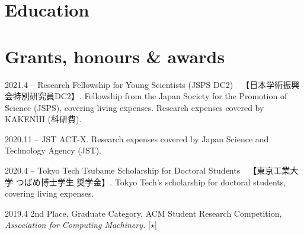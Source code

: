 \documentclass[11pt]{article} %
\newcommand{\伊澤侑祐}{\underline{伊澤侑祐}}
\begin{document}





\section*{Education}




\section*{Grants, honours \& awards}

\grant
{2021.4 -- }
{Research Fellowship for Young Scientists (JSPS DC2)~~【日本学術振興会特別研究員DC2】.}
{Fellowship from the Japan Society for the Promotion of Science (JSPS), covering
  living expenses. Research expenses covered by KAKENHI (科研費).}

\grant
{2020.11 -- }
{JST ACT-X.}
{Research expenses covered by Japan Science and Technology Agency (JST).}

\grant
{2020.4 -- }
{Tokyo Tech Tsubame Scholarship for Doctoral Students~~【東京工業大学 つばめ博士学生
  奨学金】.}
{Tokyo Tech's scholarship for doctoral students, covering living expenses.}

\grant
{2019.4}
{2nd Place, Graduate Category, ACM Student Research Competition, \textit{Association for Computing Machinery.}
  [$\star$]}
{}
\end{document}
